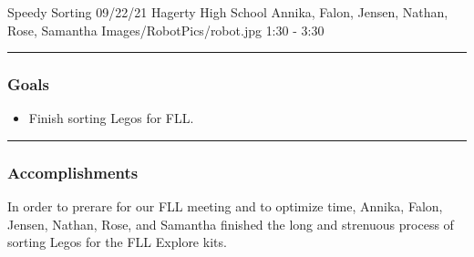\insertmeeting 
	{Speedy Sorting} 
	{09/22/21}
	{Hagerty High School}
	{Annika, Falon, Jensen, Nathan, Rose, Samantha}
	{Images/RobotPics/robot.jpg}
	{1:30 - 3:30}
	
\noindent\hfil\rule{\textwidth}{.4pt}\hfil
\subsubsection*{Goals}
\begin{itemize}
    \item Finish sorting Legos for FLL.

\end{itemize} 

\noindent\hfil\rule{\textwidth}{.4pt}\hfil

\subsubsection*{Accomplishments}
In order to prerare for our FLL meeting and to optimize time, Annika, Falon, Jensen, Nathan, Rose, and Samantha finished the long and strenuous process of sorting Legos for the FLL Explore kits. 

